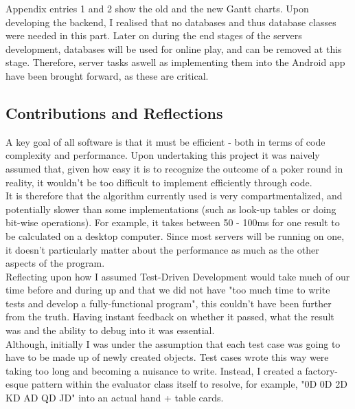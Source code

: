 \documentclass[11pt]{article}
\begin{document}
Appendix entries 1 and 2 show the old and the new Gantt charts. Upon developing the backend, I realised that no databases and thus database classes were needed in this part. Later on during the end stages of the servers development, databases will be used for online play, and can be removed at this stage. Therefore, server tasks aswell as implementing them into the Android app have been brought forward, as these are critical.  \\






\subsection{Contributions and Reflections}

A key goal of all software is that it must be efficient - both in terms of code complexity and performance. Upon undertaking this project it was naively assumed that, given how easy it is to recognize the outcome of a poker round in reality, it wouldn't be too difficult to implement efficiently through code. \\

It is therefore that the algorithm currently used is very compartmentalized, and potentially slower than some implementations (such as look-up tables or doing bit-wise operations). For example, it takes between 50 - 100ms for one result to be calculated on a desktop computer. Since most servers will be running on one, it doesn't particularly matter about the performance as much as the other aspects of the program.\\

Reflecting upon how I assumed Test-Driven Development would take much of our time before and during up and that we did not have "too much time to write tests and develop a fully-functional program", this couldn't have been further from the truth. Having instant feedback on whether it passed, what the result was and the ability to debug into it was essential. \\

Although, initially I was under the assumption that each test case was going to have to be made up of newly created objects. Test cases wrote this way were taking too long and becoming a nuisance to write. Instead, I created a factory-esque pattern within the evaluator class itself to resolve, for example, "0D 0D 2D KD AD QD JD" into an actual hand + table cards.  \\
\end{document}
